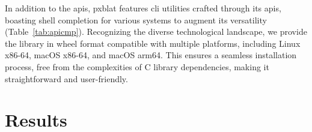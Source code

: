 \documentclass[10pt,letterpaper]{article}
\newlength\savedwidth
\newcommand\thickhline{\noalign{\global\savedwidth\arrayrulewidth\global\arrayrulewidth 2pt}%
\hline
\noalign{\global\arrayrulewidth\savedwidth}}
\begin{document}
In addition to the \glspl{api}, \gls{pxblat} features \gls{cli} utilities crafted through its \glspl{api}, boasting shell completion for various systems to augment its versatility (Table~\ref{tab:apicmp}).
Recognizing the diverse technological landscape, we provide the library in wheel format compatible with multiple platforms, including Linux x86-64, macOS x86-64, and macOS arm64.
This ensures a seamless installation process, free from the complexities of C library dependencies, making it straightforward and user-friendly.


\section*{Results}

\end{document}
